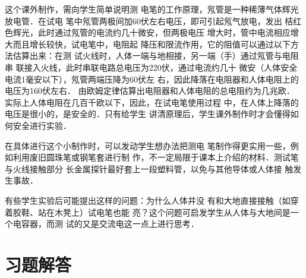 这个课外制作，需向学生简单说明测
电笔的工作原理，氖管是一种稀薄气体辉光放电管．在试电
笔中氖管两极间加60伏左右电压，即可引起氖气放电，发出
桔红色辉光，此时通过氖管的电流约几十微安，但两极电压
增大时，管中电流相应增大而且增长较快，试电笔中，电阻起
降压和限流作用，它的阻值可以通过以下方法估算出来：在测
试火线时，人体一端与地相接，另一端（手）通过氖管与电阻串
联接入火线，此时串联电路总电压为220伏，通过电流约几十
微安（人体安全电流1毫安以下），氖管两端压降为60伏左
右，因此降落在电阻器和人体电阻上的电压为160伏左右．
由欧姆定律估算出电阻器和人体电阻的总电阻约为几兆欧．
实际上人体电阻在几百千欧以下，因此，在试电笔使用过程
中，在人体上降落的电压是很小的，是安全的．只有给学生
讲清原理后，学生课外制作时才会懂得如何安全进行实验．

在具体进行这个小制作时，可以发动学生想办法把测电
笔制作得更实用一些，例如利用废旧圆珠笔或钢笔套进行制
作，不一定局限于课本上介绍的材料．测试笔与火线接触部分
长金属探针最好套上一段塑料管，以免与其他导体或人体接
触发生事故．

有些学生实验后可能提出这样的问题：为什么人体并没
有和大地直接接触（如穿着胶鞋、站在木凳上）试电笔也能
亮？这个问题可启发学生从人体与大地间是一个电容器，而测
试的又是交流电这一点上进行思考．

\section{习题解答}
